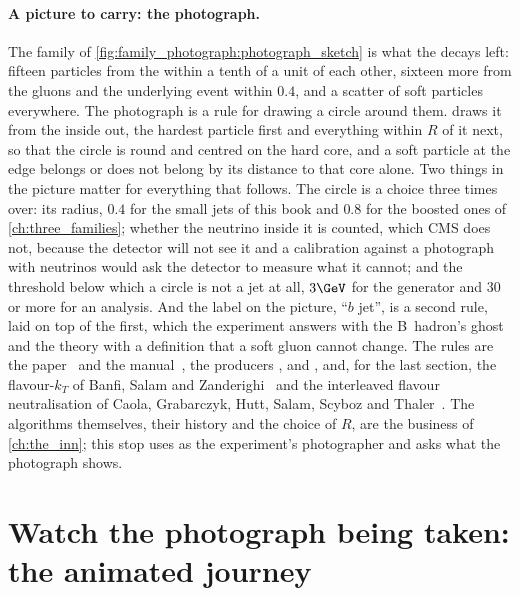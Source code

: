 \paragraph{A picture to carry: the photograph.} The family of
\cref{fig:family_photograph:photograph_sketch} is what the decays left:
fifteen particles from the \Bbar within a tenth of a unit of each other,
sixteen more from the gluons and the underlying event within $0.4$, and a
scatter of soft particles everywhere. The photograph is a rule for
drawing a circle around them. \antikt draws it from the inside out, the
hardest particle first and everything within $R$ of it next, so that the
circle is round and centred on the hard core, and a soft particle at the
edge belongs or does not belong by its distance to that core alone. Two
things in the picture matter for everything that follows. The circle is
a choice three times over: its radius, $0.4$ for the small jets of this
book and $0.8$ for the boosted ones of \cref{ch:three_families}; whether
the neutrino inside it is counted, which CMS does not, because the
detector will not see it and a calibration against a photograph with
neutrinos would ask the detector to measure what it cannot; and the
threshold below which a circle is not a jet at all, $3\GeV$ for the
generator and $30$ or more for an analysis. And the label on the picture,
``$b$ jet'', is a second rule, laid on top of the first, which the
experiment answers with the B~hadron's ghost and the theory with a
definition that a soft gluon cannot change. The rules are the \antikt
paper~\cite{Cacciari:2008gp} and the \FASTJET manual~\cite{Cacciari:2011ma},
the \CMSSW producers , 
and , and, for the last section, the
flavour-$k_T$ of Banfi, Salam and Zanderighi~\cite{Banfi:2006hf} and the
interleaved flavour neutralisation of Caola, Grabarczyk, Hutt, Salam,
Scyboz and Thaler~\cite{Caletti:2022glq}. The algorithms themselves, their
history and the choice of $R$, are the business of \cref{ch:the_inn}; this
stop uses \antikt as the experiment's photographer and asks what the
photograph shows.

\section{Watch the photograph being taken: the animated journey}
\label{sec:family_photograph:animation}

